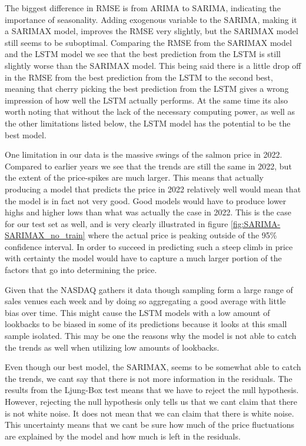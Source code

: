 The biggest difference in RMSE is from ARIMA to SARIMA, indicating the importance of seasonality. Adding exogenous variable to the SARIMA, making it a SARIMAX model, improves the RMSE very slightly, but the SARIMAX model still seems to be suboptimal. Comparing the RMSE from the SARIMAX model and the LSTM model we see that the best prediction from the LSTM is still slightly worse than the SARIMAX model. This being said there is a little drop off in the RMSE from the best prediction from the LSTM to the second best, meaning that cherry picking the best prediction from the LSTM gives a wrong impression of how well the LSTM actually performs. At the same time its also worth noting that without the lack of the necessary computing power, as well as the other limitations listed below, the LSTM model has the potential to be the best model.

One limitation in our data is the massive swings of the salmon price in 2022. Compared to earlier years we see that the trends are still the same in 2022, but the extent of the price-spikes are much larger. This means that actually producing a model that predicts the price in 2022 relatively well would mean that the model is in fact not very good. Good models would have to produce lower highs and higher lows than what was actually the case in 2022. This is the case for our test set as well, and is very clearly illustrated in figure \ref{fig:SARIMA-SARIMAX_no_train} where the actual price is peaking outside of the 95\% confidence interval. In order to succeed in predicting such a steep climb in price with certainty the model would have to capture a much larger portion of the factors that go into determining the price.

Given that the NASDAQ gathers it data though sampling form a large range of sales venues each week and by doing so aggregating a good average with little bias over time. This might cause the LSTM models with a low amount of lookbacks to be biased in some of its predictions because it looks at this small sample isolated. This may be one the reasons why the model is not able to catch the trends as well when utilizing low amounts of lookbacks.

Even though our best model, the SARIMAX, seems to be somewhat able to catch the trends, we cant say that there is not more information in the residuals. The results from the Ljung-Box test means that we have to reject the null hypothesis. However, rejecting the null hypothesis only tells us that we cant claim that there is not white noise. It does not mean that we can claim that there is white noise. This uncertainty means that we cant be sure how much of the price fluctuations are explained by the model and how much is left in the residuals. 

